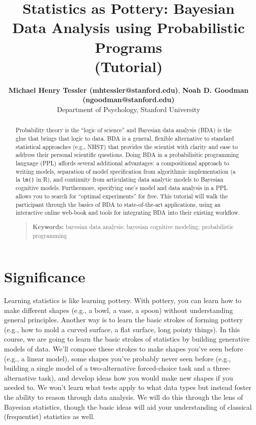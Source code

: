 \documentclass[10pt,letterpaper]{article}
\title{Statistics as Pottery: Bayesian Data Analysis using Probabilistic Programs \\(Tutorial)}
\author{{\large \bf Michael Henry Tessler (mhtessler@stanford.edu)}, {\large \bf Noah D. Goodman (ngoodman@stanford.edu)}  \\
  Department of Psychology, Stanford University
  }
\begin{document}
\maketitle

\begin{abstract}

Probability theory is the ``logic of science'' \cite{jaynes2003probability} and Bayesian data analysis (BDA) is the glue that brings that logic to data.
BDA is a general, flexible alternative to standard statistical approaches (e.g., NHST) that provides the scientist with clarity and ease to address their personal scientific questions. 
Doing BDA in a probabilisitic programming language (PPL) affords several additional advantages:  a compositional approach to writing models, separation of model specification from algorithmic implementation (a la \lstinline{lm()} in R), and continuity from articulating data analytic models to Bayesian cognitive models. 
Furthermore, specifying one's model and data analysis in a PPL allows you to search for ``optimal experiments'' for free. 
This tutorial will walk the participant through the basics of BDA to state-of-the-art applications, using an interactive online web-book and tools for integrating BDA into their existing workflow. 
\begin{quote}
\small
\textbf{Keywords:} 
bayesian data analysis; bayesian cognitive modeling; probabilistic programming
\end{quote}

\end{abstract}





\section{Significance}

Learning statistics is like learning pottery. 
With pottery, you can learn how to make different shapes (e.g., a bowl, a vase, a spoon) without understanding general principles. 
Another way is to learn the basic strokes of forming pottery (e.g., how to mold a curved surface, a flat surface, long pointy things). 
In this course, we are going to learn the basic strokes of statistics by building generative models of data. 
We'll compose these strokes to make shapes you've seen before (e.g., a linear model), some shapes you've probably never seen before (e.g., building a single model of a two-alternative forced-choice task and a three-alternative task), and develop ideas how you would make new shapes if you needed to. 
We won't learn what tests apply to what data types but instead foster the ability to reason through data analysis. 
We will do this through the lens of Bayesian statistics, though the basic ideas will aid your understanding of classical (frequentist) statistics as well.
\end{document}
